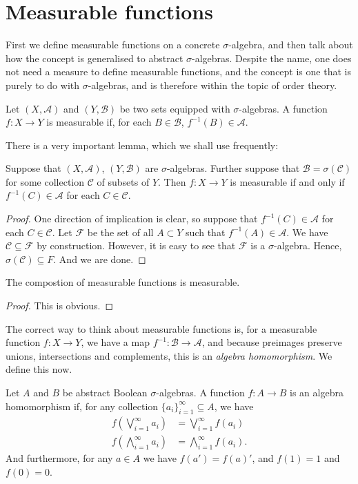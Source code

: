 \documentclass{owmaths}
\begin{document}
\section{Measurable functions}
First we define measurable functions on a concrete $\sigma$-algebra, and then talk
about how the concept is generalised to abstract $\sigma$-algebras.
Despite the name, one does not need a measure to define measurable functions,
and the concept is one that is purely to do with $\sigma$-algebras, and is therefore
within the topic of order theory.
\begin{definition}
    Let $(X,\mathcal{A})$ and $(Y,\mathcal{B})$ be two sets equipped
    with $\sigma$-algebras. A function $f:X\rightarrow Y$
    is measurable if, for each $B \in \mathcal{B}$, $f^{-1}(B) \in \mathcal{A}$.
\end{definition}

There is a very important lemma, which we shall use frequently:
\begin{lemma}
    Suppose that $(X,\mathcal{A})$, $(Y,\mathcal{B})$ are $\sigma$-algebras.
    Further suppose that $\mathcal{B} = \sigma(\mathcal{C})$ for some
    collection $\mathcal{C}$ of subsets of $Y$. Then $f:X\rightarrow Y$
    is measurable if and only if $f^{-1}(C) \in \mathcal{A}$ for each $C \in \mathcal{C}$.
\end{lemma}
\begin{proof}
    One direction of implication is clear, so suppose that $f^{-1}(C) \in \mathcal{A}$
    for each $C \in \mathcal{C}$. Let $\mathcal{F}$ be the set of all $A \subset Y$
    such that $f^{-1}(A) \in \mathcal{A}$. We have $\mathcal{C} \subseteq \mathcal{F}$
    by construction. However, it is easy to see that $\mathcal{F}$ is a $\sigma$-algebra.
    Hence, $\sigma(\mathcal{C}) \subseteq F$. And we are done.
\end{proof}


\begin{proposition}
    The compostion of measurable functions is measurable.
\end{proposition}
\begin{proof}
    This is obvious.
\end{proof}

The correct way to think about measurable functions is, for a measurable
function $f:X\rightarrow Y$, we have a map $f^{-1}:\mathcal{B}\rightarrow\mathcal{A}$,
and because preimages preserve unions, intersections and complements, this is an
\emph{algebra homomorphism}. We define this now.
\begin{definition}
    Let $A$ and $B$ be abstract Boolean $\sigma$-algebras. A function $f:A\rightarrow B$
    is an algebra homomorphism if, for any collection $\{a_i\}_{i=1}^\infty \subseteq A$, we have
    \begin{align*}
        f\left(\bigvee_{i=1}^\infty a_i \right) &= \bigvee_{i=1}^\infty f(a_i)\\
        f\left(\bigwedge_{i=1}^\infty a_i\right) &= \bigwedge_{i=1}^\infty f(a_i).
    \end{align*}
    And furthermore, for any $a \in A$ we have $f(a') = f(a)'$, and $f(1) = 1$
    and $f(0) = 0$.
\end{definition}
\end{document}
